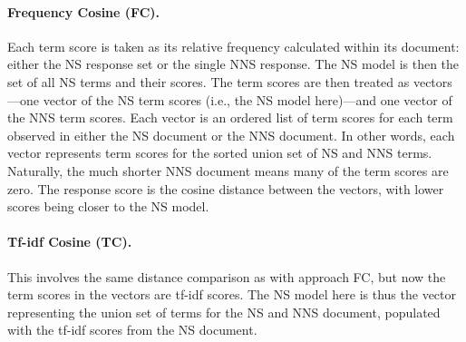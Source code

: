 \paragraph{Frequency Cosine (FC).} Each term score is taken as its relative frequency 
calculated within its document: either the NS response set or the single NNS response. The NS model is then the set of all NS terms and their scores. The term scores are then treated as vectors---one vector of the NS term scores (i.e., the NS model here)---and one vector of the NNS term scores. Each vector is an ordered list of term scores for each term observed in either the NS document or the NNS document. In other words, each vector represents term scores for the sorted union set of NS and NNS terms. Naturally, the much shorter NNS document means many of the term scores are zero. The response score is the cosine distance between the vectors, with lower scores being closer to the NS model.

\paragraph{Tf-idf Cosine (TC).} This involves the same distance comparison as with approach FC, but now the term scores in the vectors are tf-idf scores. The NS model here is thus the vector representing the union set of terms for the NS and NNS document, populated with the tf-idf scores from the NS document.

\bigskip

